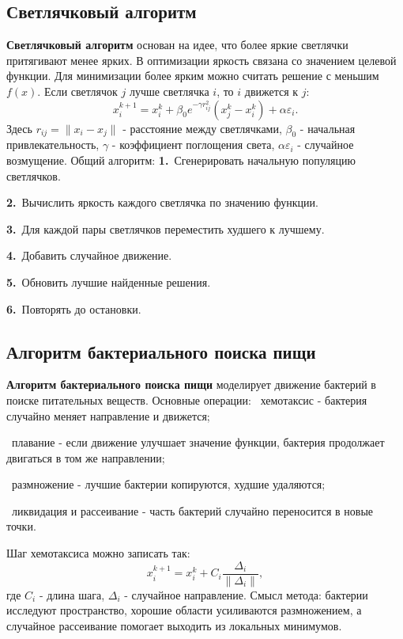 \documentclass[12pt,a4paper]{article}
\begin{document}
\subsection{Светлячковый алгоритм}
\textbf{Светлячковый алгоритм} основан на идее, что более яркие светлячки притягивают менее ярких. В оптимизации яркость связана со значением целевой функции. Для минимизации более ярким можно считать решение с меньшим $f(x)$.
Если светлячок $j$ лучше светлячка $i$, то $i$ движется к $j$:
\[
x_i^{k+1}=x_i^k+\beta_0e^{-\gamma r_{ij}^2}(x_j^k-x_i^k)+\alpha \varepsilon_i.
\]
Здесь $r_{ij}=\|x_i-x_j\|$ - расстояние между светлячками, $\beta_0$ - начальная привлекательность, $\gamma$ - коэффициент поглощения света, $\alpha \varepsilon_i$ - случайное возмущение.
Общий алгоритм:
\noindent\textbf{1.}\ Сгенерировать начальную популяцию светлячков.\par
\noindent\textbf{2.}\ Вычислить яркость каждого светлячка по значению функции.\par
\noindent\textbf{3.}\ Для каждой пары светлячков переместить худшего к лучшему.\par
\noindent\textbf{4.}\ Добавить случайное движение.\par
\noindent\textbf{5.}\ Обновить лучшие найденные решения.\par
\noindent\textbf{6.}\ Повторять до остановки.\par
\subsection{Алгоритм бактериального поиска пищи}
\textbf{Алгоритм бактериального поиска пищи} моделирует движение бактерий в поиске питательных веществ. Основные операции:
\noindent\textbullet\ хемотаксис - бактерия случайно меняет направление и движется;\par
\noindent\textbullet\ плавание - если движение улучшает значение функции, бактерия продолжает двигаться в том же направлении;\par
\noindent\textbullet\ размножение - лучшие бактерии копируются, худшие удаляются;\par
\noindent\textbullet\ ликвидация и рассеивание - часть бактерий случайно переносится в новые точки.\par
Шаг хемотаксиса можно записать так:
\[
x_i^{k+1}=x_i^k+C_i\frac{\Delta_i}{\|\Delta_i\|},
\]
где $C_i$ - длина шага, $\Delta_i$ - случайное направление.
Смысл метода: бактерии исследуют пространство, хорошие области усиливаются размножением, а случайное рассеивание помогает выходить из локальных минимумов.
\end{document}
